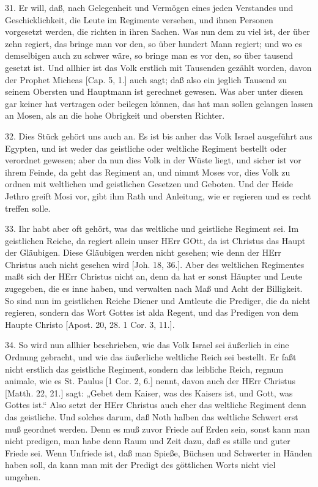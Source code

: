 31. Er will, daß, nach Gelegenheit und Vermögen eines jeden Verstandes und Geschicklichkeit, die Leute im Regimente versehen, und ihnen Personen vorgesetzt werden, die richten in ihren Sachen. Was nun dem zu viel ist, der über zehn regiert, das bringe man vor den, so über hundert Mann regiert; und wo es demselbigen auch zu schwer wäre, so bringe man es vor den, so über tausend gesetzt ist. Und allhier ist das Volk erstlich mit Tausenden gezählt worden, davon der Prophet Micheas [Cap. 5, 1.] auch sagt; daß also ein jeglich Tausend zu seinem Obersten und Hauptmann ist gerechnet gewesen. Was aber unter diesen gar keiner hat vertragen oder beilegen können, das hat man sollen gelangen lassen an Mosen, als an die hohe Obrigkeit und obersten Richter.

32. Dies Stück gehört uns auch an. Es ist bis anher das Volk Israel ausgeführt aus Egypten, und ist weder das geistliche oder weltliche Regiment bestellt oder verordnet gewesen; aber da nun dies Volk in der Wüste liegt, und sicher ist vor ihrem Feinde, da geht das Regiment an, und nimmt Moses vor, dies Volk zu ordnen mit weltlichen und geistlichen Gesetzen und Geboten. Und der Heide Jethro greift Mosi vor, gibt ihm Rath und Anleitung, wie er regieren und es recht treffen solle.

33. Ihr habt aber oft gehört, was das weltliche und geistliche Regiment sei. Im geistlichen Reiche, da regiert allein unser HErr GOtt, da ist Christus das Haupt der Gläubigen. Diese Gläubigen werden nicht gesehen; wie denn der HErr Christus auch nicht gesehen wird [Joh. 18, 36.]. Aber des weltlichen Regimentes maßt sich der HErr Christus nicht an, denn da hat er sonst Häupter und Leute zugegeben, die es inne haben, und verwalten nach Maß und Acht der Billigkeit. So sind nun im geistlichen Reiche Diener und Amtleute die Prediger, die da nicht regieren, sondern das Wort Gottes ist alda Regent, und das Predigen von dem Haupte Christo [Apost. 20, 28. 1 Cor. 3, 11.].

34. So wird nun allhier beschrieben, wie das Volk Israel sei äußerlich in eine Ordnung gebracht, und wie das äußerliche weltliche Reich sei bestellt. Er faßt nicht erstlich das geistliche Regiment, sondern das leibliche Reich, regnum animale, wie es St. Paulus [1 Cor. 2, 6.] nennt, davon auch der HErr Christus [Matth. 22, 21.] sagt: „Gebet dem Kaiser, was des Kaisers ist, und Gott, was Gottes ist.“ Also setzt der HErr Christus auch eher das weltliche Regiment denn das geistliche. Und solches darum, daß Noth halben das weltliche Schwert erst muß geordnet werden. Denn es muß zuvor Friede auf Erden sein, sonst kann man nicht predigen, man habe denn Raum und Zeit dazu, daß es stille und guter Friede sei. Wenn Unfriede ist, daß man Spieße, Büchsen und Schwerter in Händen haben soll, da kann man mit der Predigt des göttlichen Worts nicht viel umgehen.

